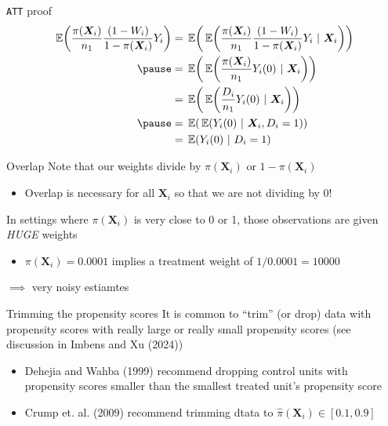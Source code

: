 \documentclass[aspectratio=169,t,11pt,table]{beamer}
\begin{document}
\begin{frame}{\texttt{ATT} proof}
  \begin{align*}
    \expec{\frac{\pi(\bm{X}_i)}{n_1} \frac{(1 - W_i)}{1 - \pi(\bm{X}_i)} Y_i} 
    &= \expec{ \expec{ \frac{\pi(\bm{X}_i)}{n_1} \frac{(1 - W_i)}{1 - \pi(\bm{X}_i)} Y_i }{\bm{X}_i} } \\ \pause
    &= \expec{ \expec{\frac{\pi(\bm{X}_i)}{n_1} Y_i(0)}{\bm{X}_i} } \\
    &= \expec{ \expec{\frac{D_i}{n_1} Y_i(0)}{\bm{X}_i} } \\ \pause
    &= \expec{ \expec{Y_i(0)}{\bm{X}_i, D_i = 1} } \\
    &= \expec{Y_i(0)}{D_i = 1}
  \end{align*}
\end{frame}

\begin{frame}{Overlap}
  Note that our weights divide by $\pi(\bm{X}_i)$ or $1 - \pi(\bm{X}_i)$
  \begin{itemize}
    \item Overlap is necessary for all $\bm{X}_i$ so that we are not dividing by 0!
  \end{itemize}

  \pause
  \bigskip
  In settings where $\pi(\bm{X}_i)$ is very close to 0 or 1, those observations are given \emph{HUGE} weights
  \begin{itemize}
    \item $\pi(\bm{X}_i) = 0.0001$ implies a treatment weight of $1 / 0.0001 = 10000$
  \end{itemize}
  \pause
  $\implies$ very noisy estiamtes
\end{frame}

\begin{frame}{Trimming the propensity scores}
  It is common to ``trim'' (or drop) data with propensity scores with really large or really small propensity scores (see discussion in Imbens and Xu (2024))
  \begin{itemize}
    \item Dehejia and Wahba (1999) recommend dropping control units with propensity scores smaller than the smallest treated unit's propensity score
    
    \item Crump et. al. (2009) recommend trimming dtata to $\hat{\pi}(\bm{X}_i) \in [0.1, 0.9]$ 
  \end{itemize}
\end{frame}
\end{document}

